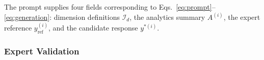 \documentclass[conference,a4paper]{IEEEtran}
\begin{document}
%
%
%
%
%
%

The prompt supplies four fields corresponding to
Eqs.~\eqref{eq:prompt}--\eqref{eq:generation}:
dimension definitions $\mathcal{I}_d$, the analytics
summary $A^{(i)}$, the expert reference
$y^{(i)}_{\text{ref}}$, and the candidate response
$y^{*(i)}$.

\subsubsection{Expert Validation}

%
\end{document}
